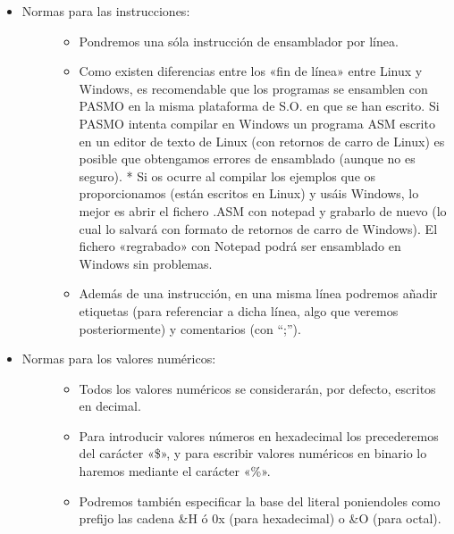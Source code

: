 \documentclass[letterpaper,10pt,spanish]{sphinxmanual}
\begin{document}
\begin{itemize}
\item {} \begin{description}
\item[{Normas para las instrucciones:}] \leavevmode\begin{itemize}
\item {} 
Pondremos una sóla instrucción de ensamblador por línea.

\item {} 
Como existen diferencias entre los «fin de línea» entre Linux y Windows, es recomendable que los programas se ensamblen con PASMO en la misma plataforma de S.O. en que se han escrito. Si PASMO intenta compilar en Windows un programa ASM escrito en un editor de texto de Linux (con retornos de carro de Linux) es posible que obtengamos errores de ensamblado (aunque no es seguro). * Si os ocurre al compilar los ejemplos que os proporcionamos (están escritos en Linux) y usáis Windows, lo mejor es abrir el fichero .ASM con notepad y grabarlo de nuevo (lo cual lo salvará con formato de retornos de carro de Windows). El fichero «regrabado» con Notepad podrá ser ensamblado en Windows sin problemas.

\item {} 
Además de una instrucción, en una misma línea podremos añadir etiquetas (para referenciar a dicha línea, algo que veremos posteriormente) y comentarios (con “;”).

\end{itemize}

\end{description}

\item {} \begin{description}
\item[{Normas para los valores numéricos:}] \leavevmode\begin{itemize}
\item {} 
Todos los valores numéricos se considerarán, por defecto, escritos en decimal.

\item {} 
Para introducir valores números en hexadecimal los precederemos del carácter «\$», y para escribir valores numéricos en binario lo haremos mediante el carácter «\%».

\item {} 
Podremos también especificar la base del literal poniendoles como prefijo las cadena \&H ó 0x (para hexadecimal) o \&O (para octal).


\end{itemize}
\end{description}
\end{itemize}
\end{document}
